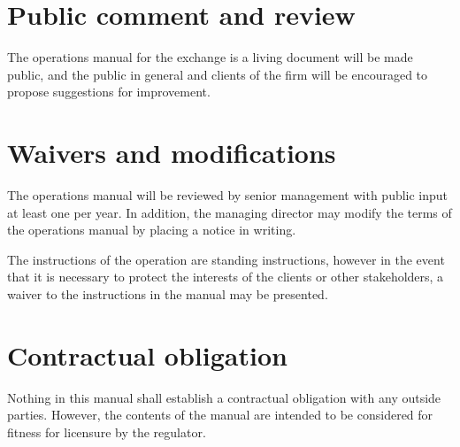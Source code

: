 \section{Public comment and review}
The operations manual for the exchange is a living document will be
made public, and the public in general and clients of the firm will be
encouraged to propose suggestions for improvement.

\section{Waivers and modifications}
The operations manual will be reviewed by senior management with
public input at least one per year.  In addition, the managing
director may modify the terms of the operations manual by placing a
notice in writing.

The instructions of the operation are standing instructions, however
in the event that it is necessary to protect the interests of the
clients or other stakeholders, a waiver to the instructions in the
manual may be presented.

\section{Contractual obligation}
Nothing in this manual shall establish a contractual obligation with
any outside parties.  However, the contents of the manual are intended
to be considered for fitness for licensure by the regulator.
